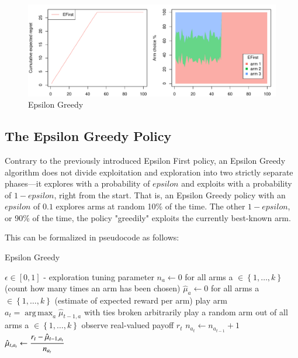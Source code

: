 \documentclass{jss}\usepackage[]{graphicx}\usepackage[]{color}
\makeatletter
\def\maxwidth{ %
  \ifdim\Gin@nat@width>\linewidth
    \linewidth
  \else
    \Gin@nat@width
  \fi
}
\newenvironment{knitrout}{}{} %
\DeclareMathOperator*{\argmax}{arg\,max}
\makeatother
\begin{document}
\begin{center}
\begin{knitrout}
\color{fgcolor}\begin{figure}[H]
\includegraphics[width=\maxwidth,]{fig/efpolicy-1} \caption[Epsilon Greedy]{Epsilon Greedy}\label{fig:efpolicy}
\end{figure}


\end{knitrout}
\end{center}

\subsection{The Epsilon Greedy Policy}

Contrary to the previously introduced Epsilon First policy, an Epsilon Greedy algorithm does not divide exploitation and exploration into two strictly separate phases---it explores with a probability of $epsilon$ and exploits with a probability of $1-epsilon$, right from the start. That is, an Epsilon Greedy policy with an $epsilon$ of $0.1$ explores arms at random 10\% of the time. The other $1-epsilon$, or 90\% of the time, the policy "greedily" exploits the currently best-known arm.

This can be formalized in pseudocode as follows:

\begin{algorithm}[H]
\caption{Epsilon Greedy}
\label{Alg:EpsilonGreedy}
\begin{algorithmic}
\REQUIRE \(    \epsilon  \in \left[ 0,1 \right] \) - exploration tuning parameter
\STATE \( n_{a} \leftarrow 0 \) for all arms a \(  \in \left\{ 1, \dots, k \right\} \)  (count how many times an arm has been chosen)
\STATE \( \hat{\mu}_{a} \leftarrow 0 \) for all arms a  \(   \in \left\{ 1, \dots, k \right\} \)  (estimate of expected reward per arm)
		\STATE play arm \(a_t = \argmax_a  \hat{\mu}_{t-1,a}  \) with ties broken arbitrarily
	\ELSE
		\STATE play a random arm out of all arms a \(  \in \left\{ 1, \dots, k \right\} \)
	\ENDIF
	\STATE observe real-valued payoff $r_t$
	\STATE \( n_{a_{t}} \leftarrow n_{a_{t-1}} + 1  \)
   \STATE \( \hat{\mu}_{t,a_{t}} \leftarrow   \cfrac{r_t - \hat{\mu}_{t-1,a_{t}} }{n_{a_{t}}}   \)
\ENDFOR
\end{algorithmic}
\end{algorithm}
\end{document}
